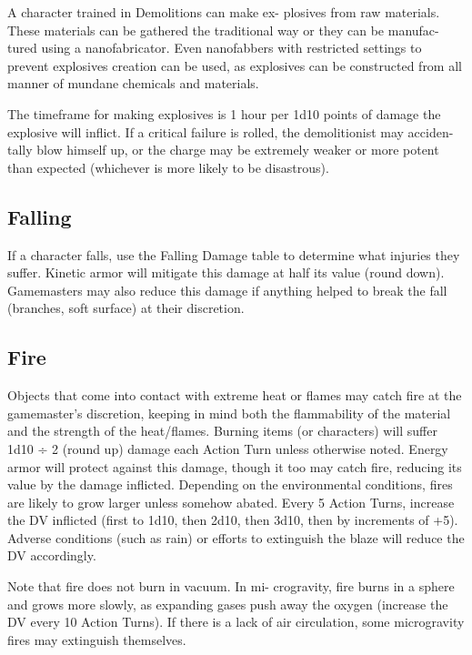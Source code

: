 A character trained in Demolitions can make ex-
plosives from raw materials. These materials can be 
gathered the traditional way or they can be manufac-
tured using a nanofabricator. Even nanofabbers with 
restricted settings to prevent explosives creation can 
be used, as explosives can be constructed from all 
manner of mundane chemicals and materials.

The timeframe for making explosives is 1 hour per 
1d10 points of damage the explosive will inflict. If a 
critical failure is rolled, the demolitionist may acciden-
tally blow himself up, or the charge may be extremely 
weaker or more potent than expected (whichever is 
more likely to be disastrous).

\subsection{Falling}

If a character falls, use the Falling Damage table to 
determine what injuries they suffer. Kinetic armor 
will mitigate this damage at 
half its value (round down). 
Gamemasters may also reduce 
this damage if anything helped 
to break the fall (branches, soft 
surface) at their discretion.

\subsection{Fire}

Objects that come into contact with extreme heat or 
flames may catch fire at the gamemaster's discretion, 
keeping in mind both the flammability of the material 
and the strength of the heat/flames. Burning items (or 
characters) will suffer 1d10 ÷ 2 (round up) damage 
each Action Turn unless otherwise noted. Energy 
armor will protect against this damage, though it 
too may catch fire, reducing its value by the damage 
inflicted. Depending on the environmental conditions, 
fires are likely to grow larger unless somehow abated. 
Every 5 Action Turns, increase the DV inflicted (first 
to 1d10, then 2d10, then 3d10, then by increments 
of +5). Adverse conditions (such as rain) or efforts to 
extinguish the blaze will reduce the DV accordingly.

Note that fire does not burn in vacuum. In mi-
crogravity, fire burns in a sphere and grows more 
slowly, as expanding gases push away the oxygen 
(increase the DV every 10 Action Turns). If there is a 
lack of air circulation, some microgravity fires may 
extinguish themselves.

